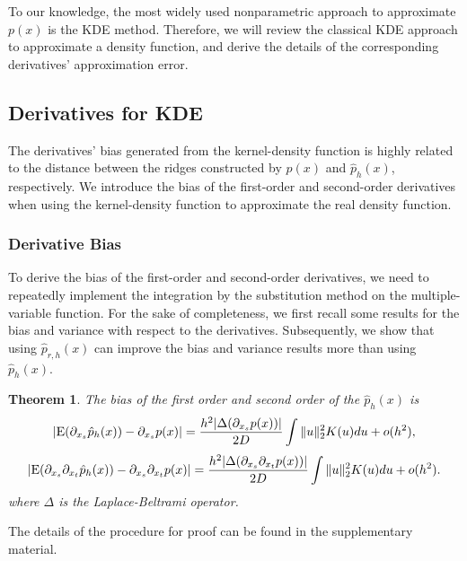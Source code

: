 \documentclass[aos,preprint]{imsart}
\newtheorem{theorem}{Theorem}[section]
\theoremstyle{remark}
\begin{document}
To our knowledge, the most widely used nonparametric approach to approximate $p(x)$ is the KDE method. Therefore, we will review the classical KDE approach to approximate a density function, and derive the details of the corresponding derivatives' approximation error.
\subsection{Derivatives for KDE}
The derivatives' bias generated from the kernel-density function is highly related to the distance between the ridges constructed by $p(x)$ and $\hat{p}_h(x)$, respectively. We introduce the bias of the first-order and second-order derivatives when using the kernel-density function to approximate the real density function.
\subsubsection{Derivative Bias}
To derive the bias of the first-order and second-order derivatives, we need to repeatedly implement the integration by the substitution method on the multiple-variable function. For the sake of completeness, we first recall some results for the bias and variance with respect to the derivatives. Subsequently, we show that using $\hat{p}_{r,h}(x)$ can improve the bias and variance results more than using $\hat{p}_{h}(x)$.

\begin{theorem}
The bias of the first order and second order of the $\hat{p}_h(x)$ is 
\begin{equation*}\label{BiasResult}
|{\rm E}(\partial_{x_s}  \hat{p}_h(x)) - \partial_{x_s}p(x)|  = \frac{h^2|\Delta (\partial_{x_s}p(x))|}{2D}  \int \|u\|_2^2 K(u) du+o(h^2),
\end{equation*}
\begin{equation*}\label{order2}
|{\rm E}( \partial_{x_s} \partial_{x_t}  \hat{p}_h(x)) -  \partial_{x_s} \partial_{x_t} p(x)| = \frac{h^2 |\Delta (\partial_{x_s}\partial_{x_t} p(x))|}{2D} \int \|u\|_2^2 K(u) du+o(h^2).
\end{equation*}
where $\Delta$ is the Laplace-Beltrami operator.
\end{theorem}
The details of the procedure for proof can be found in the supplementary material.%
\end{document}
